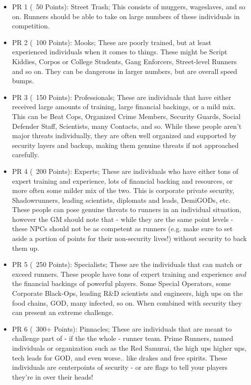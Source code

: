 \begin{multicols}{2}
	\begin{itemize}
		\item PR 1 (~50 Points): Street Trash; This consists of muggers, wageslaves, and so on. Runners should be able to take on large numbers of these individuals in competition.
		\item PR 2 (~100 Points): Mooks; These are poorly trained, but at least experienced individuals when it comes to things. These might be Script Kiddies, Corpos or College Students, Gang Enforcers, Street-level Runners and so on. They can be dangerous in larger numbers, but are overall speed bumps.
		\item PR 3 (~150 Points): Professionals; These are individuals that have either received large amounts of training, large financial backings, or a mild mix. This can be Beat Cops, Organized Crime Members, Security Guards, Social Defender Staff, Scientists, many Contacts, and so. While these people aren't major threats individually, they are often well organized and supported by security layers and backup, making them genuine threats if not approached carefully.
		\item PR 4 (~200 Points): Experts; These are individuals who have either tons of expert training and experience, lots of financial backing and resources, or more often some milder mix of the two. This is corporate private security, Shadowrunners, leading scientists, diplomats and leads, DemiGODs, etc. These people can pose genuine threats to runners in an individual situation, however the GM should note that - while they are the same point levels - these NPCs should not be as competent as runners (e.g. make sure to set aside a portion of points for their non-security lives!) without security to back them up.
		\item PR 5 (~250 Points): Specialists; These are the individuals that can match or exceed runners. These people have tons of expert training and experience \textit{and} the financial backings of powerful players. Some Special Operators, some Corporate Black-Ops, leading R\&D scientists and engineers, high ups on the food chains, GOD, many infected, so on. When combined with security they can present an extreme challenge.
		\item PR 6 (~300+ Points): Pinnacles; These are individuals that are meant to challenge part of - if the the whole - runner team. Prime Runners, named individuals or organization such as the Red Samurai, the high ups higher ups, tech leads for GOD, and even worse.. like drakes and free spirits. These individuals are centerpoints of security - or are flags to tell your players they're in over their heads!
	\end{itemize}
	

\end{multicols}
